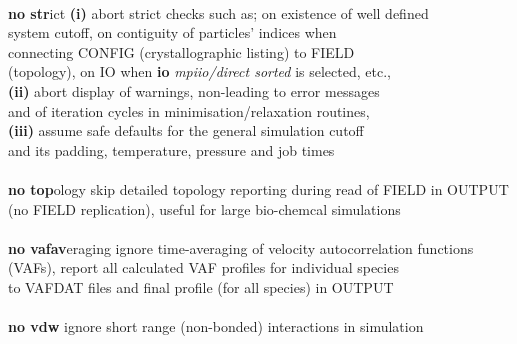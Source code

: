 \begin{tabbing}
\>                                              \> \\
\> {\bf no str}ict                              \> {\bf (i)} abort strict checks such as; on existence of well defined \\
\>                                              \> system cutoff, on contiguity of particles' indices when \\
\>                                              \> connecting CONFIG (crystallographic listing) to FIELD \\
\>                                              \> (topology), on IO when {\bf io} {\em mpiio/direct sorted} is selected, etc., \\
\>                                              \> {\bf (ii)} abort display of warnings, non-leading to error messages \\
\>                                              \> and of iteration cycles in minimisation/relaxation routines, \\
\>                                              \> {\bf (iii)} assume safe defaults for the general simulation cutoff \\
\>                                              \> and its padding, temperature, pressure and job times \\
\>                                              \> \\
\> {\bf no top}ology                            \> skip detailed topology reporting during read of FIELD in OUTPUT \\
\>                                              \> (no FIELD replication), useful for large bio-chemcal simulations \\
\>                                              \> \\
\> {\bf no vafav}eraging                        \> ignore time-averaging of velocity autocorrelation functions \\
\>                                              \> (VAFs), report all calculated VAF profiles for individual species \\
\>                                              \> to VAFDAT files and final profile (for all species) in OUTPUT \\
\>                                              \> \\
\> {\bf no vdw}                                 \> ignore short range (non-bonded) interactions in simulation \\

\end{tabbing}
